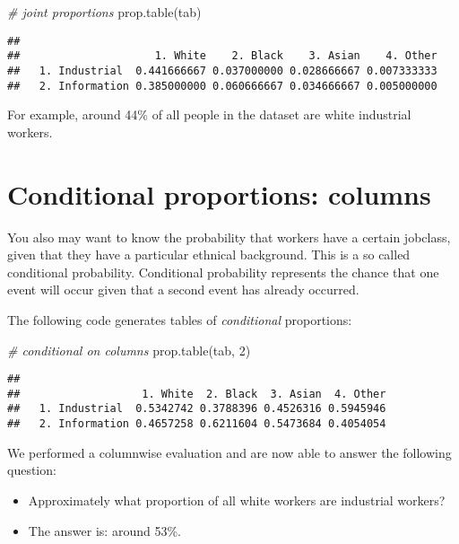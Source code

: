 \documentclass[
]{book}
\newenvironment{Shaded}{\begin{snugshade}}{\end{snugshade}}
\newcommand{\CommentTok}[1]{\textcolor[rgb]{0.56,0.35,0.01}{\textit{#1}}}
\newcommand{\DecValTok}[1]{\textcolor[rgb]{0.00,0.00,0.81}{#1}}
\newcommand{\FunctionTok}[1]{\textcolor[rgb]{0.00,0.00,0.00}{#1}}
\newcommand{\NormalTok}[1]{#1}
\providecommand{\tightlist}{%
  \setlength{\itemsep}{0pt}\setlength{\parskip}{0pt}}
\begin{document}
\begin{Shaded}
\begin{Highlighting}[]
\CommentTok{\# joint proportions}
\FunctionTok{prop.table}\NormalTok{(tab) }
\end{Highlighting}
\end{Shaded}

\begin{verbatim}
##                 
##                     1. White    2. Black    3. Asian    4. Other
##   1. Industrial  0.441666667 0.037000000 0.028666667 0.007333333
##   2. Information 0.385000000 0.060666667 0.034666667 0.005000000
\end{verbatim}

For example, around 44\% of all people in the dataset are white industrial workers.

\hypertarget{conditional-proportions-columns}{%
\section{Conditional proportions: columns}\label{conditional-proportions-columns}}

You also may want to know the probability that workers have a certain jobclass, given that they have a particular ethnical background. This is a so called conditional probability. Conditional probability represents the chance that one event will occur given that a second event has already occurred.

The following code generates tables of \emph{conditional} proportions:

\begin{Shaded}
\begin{Highlighting}[]
\CommentTok{\# conditional on columns}
\FunctionTok{prop.table}\NormalTok{(tab, }\DecValTok{2}\NormalTok{)  }
\end{Highlighting}
\end{Shaded}

\begin{verbatim}
##                 
##                   1. White  2. Black  3. Asian  4. Other
##   1. Industrial  0.5342742 0.3788396 0.4526316 0.5945946
##   2. Information 0.4657258 0.6211604 0.5473684 0.4054054
\end{verbatim}

We performed a columnwise evaluation and are now able to answer the following question:

\begin{itemize}
\tightlist
\item
  Approximately what proportion of all white workers are industrial workers?
\item
  The answer is: around 53\%.
\end{itemize}
\end{document}
